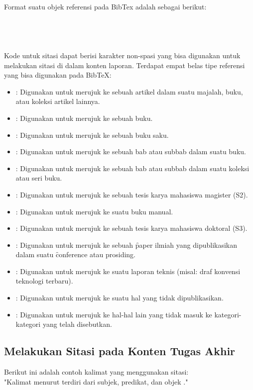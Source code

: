 Format suatu objek referensi pada BibTex adalah sebagai berikut: \\
\\
\\
\\
\code{\}}\\
Kode untuk sitasi dapat berisi karakter non-spasi yang bisa digunakan untuk melakukan sitasi di dalam konten laporan.
Terdapat empat belas tipe referensi yang bisa digunakan pada BibTeX:
\begin{itemize}
	\item {}: Digunakan untuk merujuk ke sebuah artikel dalam suatu majalah, buku, atau koleksi artikel lainnya.
	\item {}: Digunakan untuk merujuk ke sebuah buku.
	\item {}: Digunakan untuk merujuk ke sebuah buku saku.
	\item {}: Digunakan untuk merujuk ke sebuah bab atau subbab dalam suatu buku.
	\item {}: Digunakan untuk merujuk ke sebuah bab atau subbab dalam suatu koleksi atau seri buku.
	\item {}: Digunakan untuk merujuk ke sebuah tesis karya mahasiswa magister (S2).
	\item {}: Digunakan untuk merujuk ke suatu buku manual.
	\item {}: Digunakan untuk merujuk ke sebuah tesis karya mahasiswa doktoral (S3).
	\item {}: Digunakan untuk merujuk ke sebuah \f{paper} ilmiah yang dipublikasikan dalam suatu \f{conference} atau prosiding.
	\item {}: Digunakan untuk merujuk ke suatu laporan teknis (misal: draf konvensi teknologi terbaru).
	\item {}: Digunakan untuk merujuk ke suatu hal yang tidak dipublikasikan.
	\item {}: Digunakan untuk merujuk ke hal-hal lain yang tidak masuk ke kategori-kategori yang telah disebutkan.
\end{itemize}

\subsection{Melakukan Sitasi pada Konten Tugas Akhir}
\label{sec:bibtexAddCite}
Berikut ini adalah contoh kalimat yang menggunakan sitasi: \\
"Kalimat menurut \cite{book:sample} terdiri dari subjek, predikat, dan objek \citep{book:sample}."

